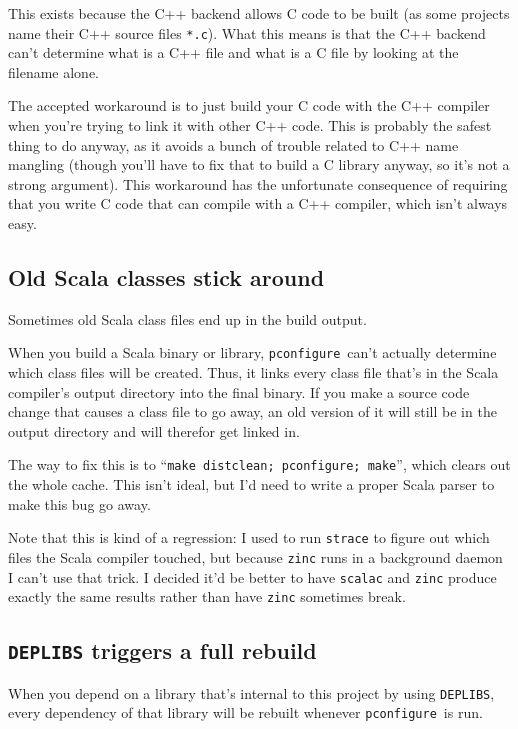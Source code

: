 \documentclass{article}
\newcommand{\pconfigure}{\texttt{pconfigure}}
\begin{document}
This exists because the C++ backend allows C code to be built (as some
projects name their C++ source files \texttt{*.c}).  What this means
is that the C++ backend can't determine what is a C++ file and what is
a C file by looking at the filename alone.

The accepted workaround is to just build your C code with the C++
compiler when you're trying to link it with other C++ code.  This is
probably the safest thing to do anyway, as it avoids a bunch of
trouble related to C++ name mangling (though you'll have to fix that
to build a C library anyway, so it's not a strong argument).  This
workaround has the unfortunate consequence of requiring that you write
C code that can compile with a C++ compiler, which isn't always easy.

\subsection{Old Scala classes stick around}

Sometimes old Scala class files end up in the build output.

When you build a Scala binary or library, \pconfigure\ can't actually
determine which class files will be created.  Thus, it links every
class file that's in the Scala compiler's output directory into the
final binary.  If you make a source code change that causes a class
file to go away, an old version of it will still be in the output
directory and will therefor get linked in.

The way to fix this is to ``\texttt{make distclean; pconfigure;
  make}'', which clears out the whole cache.  This isn't ideal, but
I'd need to write a proper Scala parser to make this bug go away.

Note that this is kind of a regression: I used to run \texttt{strace}
to figure out which files the Scala compiler touched, but because
\texttt{zinc} runs in a background daemon I can't use that trick.  I
decided it'd be better to have \texttt{scalac} and \texttt{zinc}
produce exactly the same results rather than have \texttt{zinc}
sometimes break.

\subsection{\texttt{DEPLIBS} triggers a full rebuild}

When you depend on a library that's internal to this project by using
\texttt{DEPLIBS}, every dependency of that library will be rebuilt
whenever \pconfigure\ is run.
\end{document}
